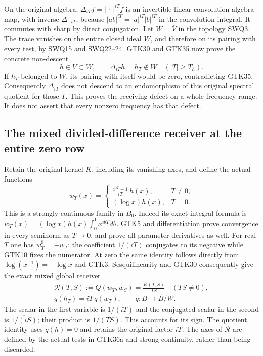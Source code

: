 On the original algebra, $\Delta_{iT}f=|\,\cdot\,|^{iT}f$
is an invertible linear convolution-algebra map, with
inverse $\Delta_{-iT}$, because
$|ab|^{iT}=|a|^{iT}|b|^{iT}$ in the convolution
integral. It commutes with sharp by direct conjugation.
Let $W=\overline V$ in the topology SWQ3. The trace
vanishes on the entire closed ideal $W$, and therefore
on its pairing with every test, by SWQ15 and SWQ22--24.
GTK30 and GTK35 now prove the concrete non-descent
\begin{equation}\tag{GTK36}
 h\in V\subset W,\qquad
 \Delta_{iT}h=h_T\notin W
                         \quad(|T|\ge T_h).
\end{equation}
If $h_T$ belonged to $W$, its pairing with itself
would be zero, contradicting GTK35. Consequently
$\Delta_{iT}$ does not descend to an endomorphism
of this original spectral quotient for those $T$.
This proves the receiving defect on a whole
frequency range. It does not assert that every
nonzero frequency has that defect.

\subsection{The mixed divided-difference receiver at the entire zero row}

Retain the original kernel $K$, including its
vanishing axes, and define the actual functions
\begin{equation}\tag{GTK36a}
 w_T(x)=
 \begin{cases}
   \displaystyle\frac{x^{iT}-1}{iT}\,h(x),&T\ne0,\\[4pt]
   (\log x)h(x),&T=0.
 \end{cases}
\end{equation}
This is a strongly continuous family in $B_0$.
Indeed its exact integral formula is
$w_T(x)=(\log x)h(x)\int_0^1x^{i\theta T}d\theta$.
GTK5 and differentiation prove convergence
in every seminorm as $T\to0$, and prove all
parameter derivatives as well. For real $T$
one has $w_T^\sharp=-w_T$: the coefficient
$1/(iT)$ conjugates to its negative while
GTK10 fixes the numerator. At zero the same
identity follows directly from
$\log(x^{-1})=-\log x$ and GTK3.
Sesquilinearity and GTK30 consequently give
the exact mixed global receiver
\begin{equation}\tag{GTK36b}
 \begin{gathered}
 \mathcal R(T,S):=Q(w_T,w_S)
            =\frac{K(T,S)}{TS}\quad(TS\ne0),\\
 q(h_T)=iT\,q(w_T),\qquad
 q:B\longrightarrow B/W .
 \end{gathered}
\end{equation}
The scalar in the first variable is $1/(iT)$
and the conjugated scalar in the second is
$\overline{1/(iS)}$; their product is
$1/(TS)$. This accounts for its sign.
The quotient identity uses $q(h)=0$ and
retains the original factor $iT$.
The axes of $\mathcal R$ are defined by
the actual tests in GTK36a and strong
continuity, rather than being discarded.

